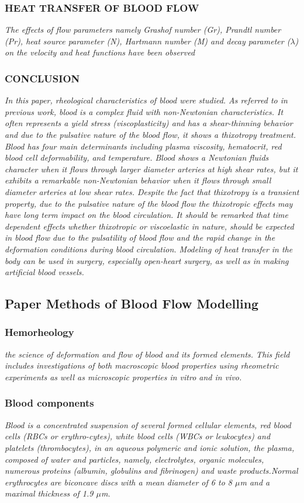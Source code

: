 \documentclass[11pt,letterpaper]{article}
\begin{document}
\subsubsection*{HEAT TRANSFER OF BLOOD FLOW}
\textit{The effects of flow parameters namely Grashof number (Gr), Prandtl number (Pr), heat source parameter (N), Hartmann number (M) and decay parameter ($\lambda$) on the velocity and heat functions have been observed}
\subsubsection*{CONCLUSION} \textit{In this paper, rheological characteristics of blood were studied. As referred to in previous work, blood is a complex fluid with non-Newtonian characteristics. It often represents a yield stress (viscoplasticity) and has a shear-thinning behavior and due to the pulsative nature of the blood flow, it shows a thixotropy treatment. Blood has four main determinants including plasma viscosity, hematocrit, red blood cell deformability, and temperature. Blood shows a Newtonian fluids character when it flows through larger diameter arteries at high shear rates, but it exhibits a remarkable non-Newtonian behavior when it flows through small diameter arteries at low shear rates. Despite the fact that thixotropy is a transient property, due to the pulsative nature of the blood flow the thixotropic effects may have long term impact on the blood circulation. It should be remarked that time dependent effects whether thixotropic or viscoelastic in nature, should be expected in blood flow due to the pulsatility of blood flow and the rapid change in the deformation conditions during blood circulation. Modeling of heat transfer in the body can be used in surgery, especially open-heart surgery, as well as in making artificial blood vessels.}
\newpage
\subsection{Paper Methods of Blood Flow Modelling}
\subsubsection*{Hemorheology}
\textit{ the science of deformation and flow of blood and its formed elements. This field includes investigations of both macroscopic blood properties using rheometric experiments as well as microscopic properties in vitro and in vivo. }
\subsubsection*{Blood components} 
\textit{Blood is a concentrated suspension of several formed cellular elements, red blood cells (RBCs or erythro-cytes), white blood cells (WBCs or leukocytes) and platelets (thrombocytes), in an aqueous polymeric and ionic solution, the plasma, composed of  water and particles, namely, electrolytes, organic
molecules, numerous proteins (albumin, globulins and fibrinogen) and waste products.\newline [...] 
Normal erythrocytes are biconcave discs with a mean
diameter of 6 to 8 $\mu$m and a maximal thickness of 1.9 $\mu$m.}
\end{document}
